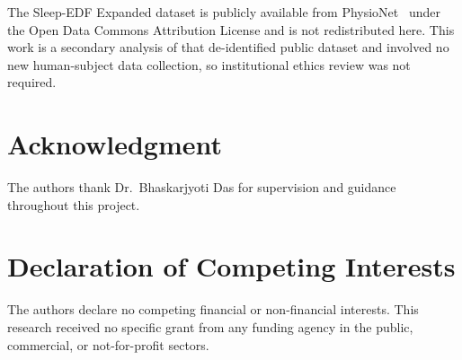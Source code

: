 \documentclass[conference]{IEEEtran}
\begin{document}
The Sleep-EDF Expanded dataset is publicly available from PhysioNet~\cite{physionet,kemp} under the Open Data
Commons Attribution License and is not redistributed here. This work is a secondary analysis of that
de-identified public dataset and involved no new human-subject data collection, so institutional ethics review
was not required.

\section*{Acknowledgment}

The authors thank Dr.\ Bhaskarjyoti Das for supervision and guidance throughout this project.

\section*{Declaration of Competing Interests}

The authors declare no competing financial or non-financial interests. This research received no specific grant
from any funding agency in the public, commercial, or not-for-profit sectors.
\end{document}
